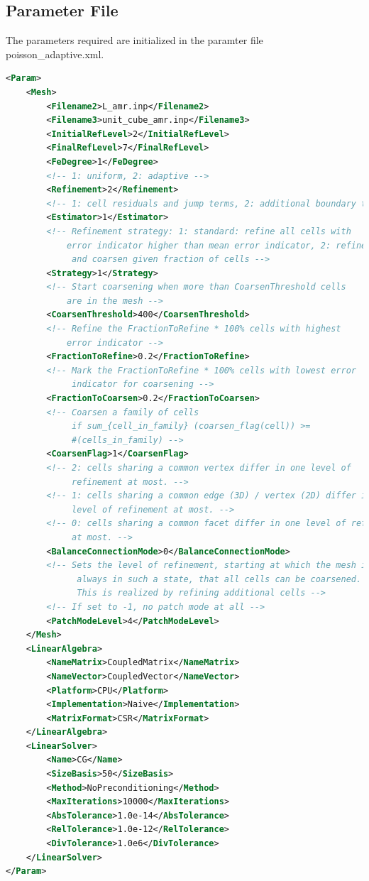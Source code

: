 \documentclass[a4paper, 11pt, twoside]{article}
\begin{document}
\subsection{Parameter File}\label{sectionparameter file}
The parameters required are initialized in the paramter file poisson\_adaptive.xml.
\begin{lstlisting}[language=XML, basicstyle={\footnotesize, \ttfamily}, keywordstyle=\color{blue}, numbers=none, tabsize=4]
<Param>
    <Mesh>
        <Filename2>L_amr.inp</Filename2>
        <Filename3>unit_cube_amr.inp</Filename3>
        <InitialRefLevel>2</InitialRefLevel>
        <FinalRefLevel>7</FinalRefLevel>
        <FeDegree>1</FeDegree>
        <!-- 1: uniform, 2: adaptive -->
        <Refinement>2</Refinement>
        <!-- 1: cell residuals and jump terms, 2: additional boundary terms -->
        <Estimator>1</Estimator>
        <!-- Refinement strategy: 1: standard: refine all cells with 
            error indicator higher than mean error indicator, 2: refine 
             and coarsen given fraction of cells -->
        <Strategy>1</Strategy>
        <!-- Start coarsening when more than CoarsenThreshold cells 
            are in the mesh -->
        <CoarsenThreshold>400</CoarsenThreshold> 
        <!-- Refine the FractionToRefine * 100% cells with highest
            error indicator -->
        <FractionToRefine>0.2</FractionToRefine>
        <!-- Mark the FractionToRefine * 100% cells with lowest error 
             indicator for coarsening -->
        <FractionToCoarsen>0.2</FractionToCoarsen>
        <!-- Coarsen a family of cells
             if sum_{cell_in_family} (coarsen_flag(cell)) >= 
             #(cells_in_family) -->
        <CoarsenFlag>1</CoarsenFlag> 
        <!-- 2: cells sharing a common vertex differ in one level of
             refinement at most. -->
        <!-- 1: cells sharing a common edge (3D) / vertex (2D) differ in one 
             level of refinement at most. -->
        <!-- 0: cells sharing a common facet differ in one level of refinement 
             at most. -->
        <BalanceConnectionMode>0</BalanceConnectionMode>
        <!-- Sets the level of refinement, starting at which the mesh is 
              always in such a state, that all cells can be coarsened.
              This is realized by refining additional cells -->
        <!-- If set to -1, no patch mode at all -->
        <PatchModeLevel>4</PatchModeLevel>
    </Mesh>
    <LinearAlgebra>
        <NameMatrix>CoupledMatrix</NameMatrix>
        <NameVector>CoupledVector</NameVector>
        <Platform>CPU</Platform>
        <Implementation>Naive</Implementation>
        <MatrixFormat>CSR</MatrixFormat>
    </LinearAlgebra>
    <LinearSolver>
        <Name>CG</Name>
        <SizeBasis>50</SizeBasis>
        <Method>NoPreconditioning</Method>
        <MaxIterations>10000</MaxIterations>
        <AbsTolerance>1.0e-14</AbsTolerance>
        <RelTolerance>1.0e-12</RelTolerance>
        <DivTolerance>1.0e6</DivTolerance>
    </LinearSolver>
</Param>
\end{lstlisting}
\end{document}

